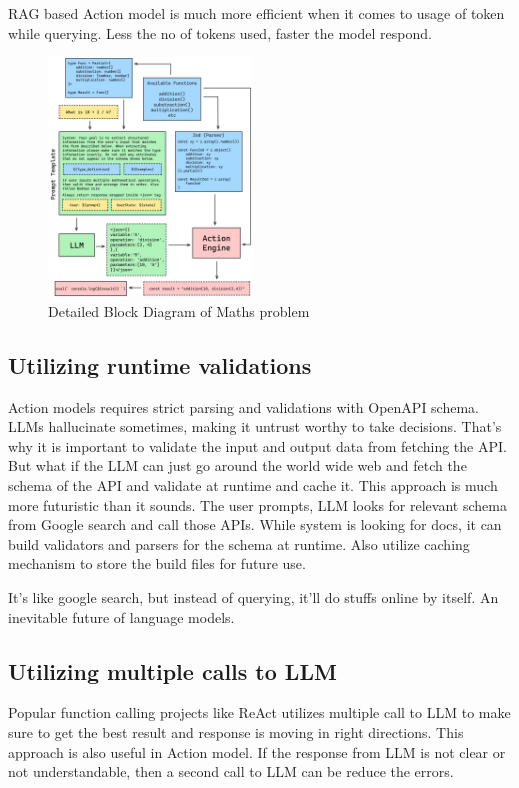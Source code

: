 \documentclass[conference]{IEEEtran}
\begin{document}
RAG based Action model is much more efficient when it comes to usage of token while querying. Less the no of tokens used, faster the model respond.

\begin{figure}[htbp]
\centering
\includegraphics[width=0.48\textwidth]{images/program.png}  
\caption{Detailed Block Diagram of Maths problem}
\label{fig}
\end{figure}


\subsection{Utilizing runtime validations}
Action models requires strict parsing and validations with OpenAPI schema. LLMs hallucinate sometimes, making it untrust worthy to take decisions. That's why it is important to validate the input and output data from fetching the API. But what if the LLM can just go around the world wide web and fetch the schema of the API and validate at runtime and cache it. This approach is much more futuristic than it sounds. The user prompts, LLM looks for relevant schema from Google search and call those APIs. While system is looking for docs, it can build validators and parsers for the schema at runtime. Also utilize caching mechanism to store the build files for future use. 

It's like google search, but instead of querying, it'll do stuffs online by itself. An inevitable future of language models. 

\subsection{Utilizing multiple calls to LLM}
Popular function calling projects like ReAct utilizes multiple call to LLM to make sure to get the best result and response is moving in right directions. This approach is also useful in Action model. If the response from LLM is not clear or not understandable, then a second call to LLM can be reduce the errors.
\end{document}
